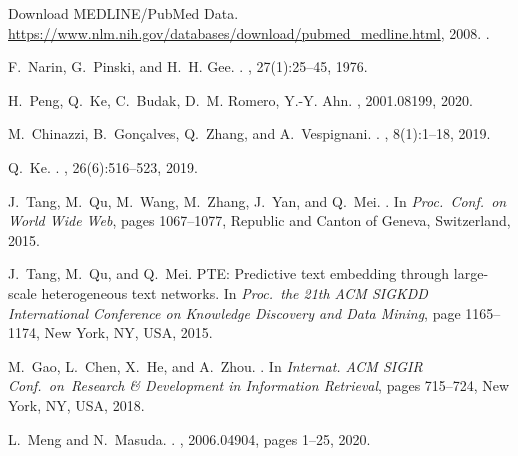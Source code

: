 \documentclass[12pt]{jarticle}
\begin{document}
\begin{thebibliography}{10}
{Download MEDLINE/PubMed Data}.
\newblock \url{https://www.nlm.nih.gov/databases/download/pubmed_medline.html},
  2008.
.

F.~Narin, G.~Pinski, and H.~H. Gee.
.
,
  27(1):25--45, 1976.


H.~Peng, Q.~Ke, C.~Budak, D.~M. Romero, Y.-Y. Ahn.
, 2001.08199, 2020.

M.~Chinazzi, B.~Gon{\c{c}}alves, Q.~Zhang, and A.~Vespignani.
.
, 8(1):1--18, 2019.

Q.~Ke.
.
,
  26(6):516--523, 2019.

J.~Tang, M.~Qu, M.~Wang, M.~Zhang, J.~Yan, and Q.~Mei.
.
\newblock In {\em Proc.~Conf.~on World Wide Web}, pages 1067--1077, Republic and Canton of Geneva,
  Switzerland, 2015.

J.~Tang, M.~Qu, and Q.~Mei.
\newblock PTE: Predictive text embedding through large-scale heterogeneous text
  networks.
\newblock In {\em Proc.~the 21th ACM SIGKDD International Conference
  on Knowledge Discovery and Data Mining}, page 1165--1174,
  New York, NY, USA, 2015.

M.~Gao, L.~Chen, X.~He, and A.~Zhou.
.
\newblock In {\em Internat. ACM SIGIR Conf.~on~Research {\&}
  Development in Information Retrieval}, pages 715--724, New York, NY, USA, 2018.

L.~Meng and N.~Masuda.
.
, 2006.04904, pages 1--25, 2020.


\end{thebibliography}
\end{document}

